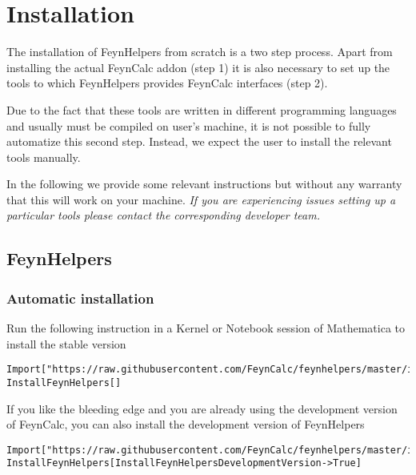 \documentclass[../FeynHelpersManual.tex]{subfiles}
\begin{document}
\hypertarget{installation}{
\section{Installation}\label{installation}}

The installation of FeynHelpers from scratch is a two step process.
Apart from installing the actual FeynCalc addon (step 1) it is also
necessary to set up the tools to which FeynHelpers provides FeynCalc
interfaces (step 2).

Due to the fact that these tools are written in different programming
languages and usually must be compiled on user's machine, it is not
possible to fully automatize this second step. Instead, we expect the
user to install the relevant tools manually.

In the following we provide some relevant instructions but without any
warranty that this will work on your machine. \emph{If you are
experiencing issues setting up a particular tools please contact the
corresponding developer team.}

\hypertarget{feynhelpers}{%
\subsection{FeynHelpers}\label{feynhelpers}}

\hypertarget{automatic-installation}{%
\subsubsection{Automatic installation}\label{automatic-installation}}

Run the following instruction in a Kernel or Notebook session of
Mathematica to install the stable version

\begin{verbatim}
Import["https://raw.githubusercontent.com/FeynCalc/feynhelpers/master/install.m"]
InstallFeynHelpers[]
\end{verbatim}

If you like the bleeding edge and you are already using the development
version of FeynCalc, you can also install the development version of
FeynHelpers

\begin{verbatim}
Import["https://raw.githubusercontent.com/FeynCalc/feynhelpers/master/install.m"]
InstallFeynHelpers[InstallFeynHelpersDevelopmentVersion->True]
\end{verbatim}
\end{document}
